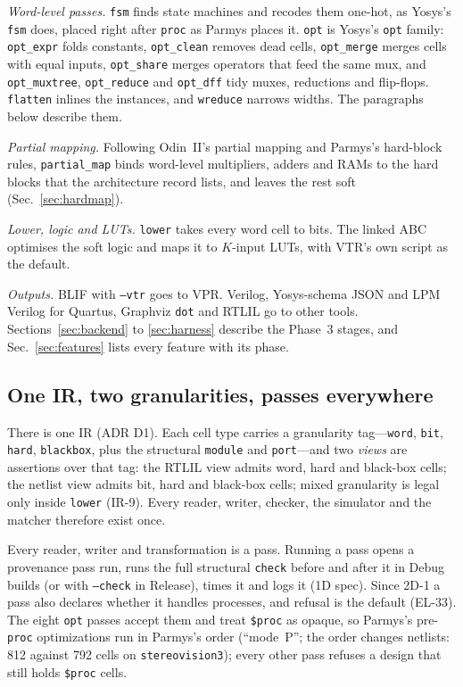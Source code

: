 \documentclass[conference]{IEEEtran}
\newcommand{\code}[1]{\texttt{#1}}
\begin{document}
\emph{Word-level passes.} \code{fsm} finds state machines and recodes them one-hot, as Yosys's
\code{fsm} does, placed right after \code{proc} as Parmys places it. \code{opt} is Yosys's
\code{opt} family: \code{opt\_expr} folds constants, \code{opt\_clean} removes dead cells,
\code{opt\_merge} merges cells with equal inputs, \code{opt\_share} merges operators that feed the
same mux, and \code{opt\_muxtree}, \code{opt\_reduce} and \code{opt\_dff} tidy
muxes, reductions and flip-flops. \code{flatten} inlines the instances, and \code{wreduce}
narrows widths. The paragraphs below describe them.

\emph{Partial mapping.} Following Odin~II's partial mapping and Parmys's hard-block rules,
\code{partial\_map} binds word-level multipliers, adders and RAMs to the hard blocks that the
architecture record lists, and leaves the rest soft (Sec.~\ref{sec:hardmap}).

\emph{Lower, logic and LUTs.} \code{lower} takes every word cell to bits. The linked ABC
optimises the soft logic and maps it to $K$-input LUTs, with VTR's own script as the default.

\emph{Outputs.} BLIF with \code{--vtr} goes to VPR. Verilog, Yosys-schema JSON and LPM Verilog for
Quartus, Graphviz \code{dot} and RTLIL go to other tools. Sections~\ref{sec:backend} to
\ref{sec:harness} describe the Phase~3 stages, and Sec.~\ref{sec:features} lists every feature
with its phase.

\subsection{One IR, two granularities, passes everywhere}

There is one IR (ADR D1). Each cell type carries a granularity tag---\code{word},
\code{bit}, \code{hard}, \code{blackbox}, plus the structural \code{module} and
\code{port}---and two \emph{views} are assertions over that tag: the RTLIL view admits word,
hard and black-box cells; the netlist view admits bit, hard and black-box cells; mixed
granularity is legal only inside \code{lower} (IR-9). Every reader, writer,
checker, the simulator and the matcher therefore exist once.

Every reader, writer and transformation is a pass. Running a pass opens a provenance pass run,
runs the full structural \code{check} before and after it in Debug builds (or with
\code{--check} in Release), times it and logs it (1D spec). Since 2D-1 a pass also declares
whether it handles processes, and refusal is the default (EL-33). The eight \code{opt} passes
accept them and treat \code{\$proc} as opaque, so Parmys's pre-\code{proc} optimizations run in
Parmys's order (``mode~P''; the order changes netlists: 812 against 792 cells on
\code{stereovision3}); every other pass refuses a design that still holds \code{\$proc} cells.
\end{document}
